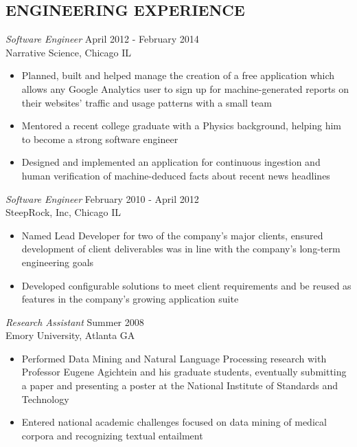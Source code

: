 \documentclass[line,margin]{res}
\begin{document}
\begin{resume}
\section{ENGINEERING EXPERIENCE}
        {\sl Software Engineer} \hfill April 2012 - February 2014 \\
        Narrative Science, Chicago IL
        \begin{itemize} 
          \item Planned, built and helped manage the creation of a 
            free application which allows any Google Analytics user to
            sign up for machine-generated reports on their websites'
            traffic and usage patterns with a small team
          \item Mentored a recent college graduate with a Physics
            background, helping him to become a strong software
            engineer
          \item Designed and implemented an application for continuous
            ingestion and human verification of machine-deduced facts
            about recent news headlines
        \end{itemize}

        {\sl Software Engineer} \hfill February 2010 - April 2012 \\
        SteepRock, Inc, Chicago IL
        \begin{itemize}
        \item Named Lead Developer for two of the company's major
          clients, ensured development of client
          deliverables was in line with the company's long-term
          engineering goals 
        \item Developed configurable solutions to meet client
          requirements and be reused as features in the company's
          growing application suite
        \end{itemize}

        {\sl Research Assistant} \hfill Summer 2008 \\
        Emory University, Atlanta GA
        \begin{itemize}
        \item Performed Data Mining and Natural Language Processing research
          with Professor Eugene Agichtein and his graduate students,
          eventually submitting a paper and presenting a poster at the National
          Institute of Standards and Technology
        \item Entered national academic challenges focused on data
          mining of medical corpora and recognizing textual entailment
        \end{itemize}

\end{resume}
\end{document}
